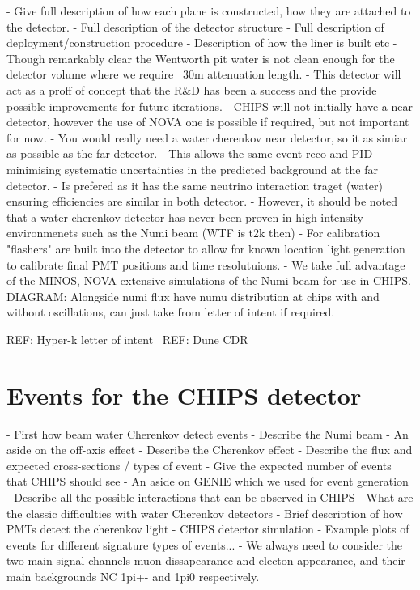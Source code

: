 - Give full description of how each plane is constructed, how they are attached to the detector.
- Full description of the detector structure
- Full description of deployment/construction procedure
- Description of how the liner is built etc
- Though remarkably clear the Wentworth pit water is not clean enough for the detector volume where we require ~30m attenuation length.
- This detector will act as a proff of concept that the R&D has been a success and the provide possible improvements for future iterations.
- CHIPS will not initially have a near detector, however the use of NOVA one is possible if required, but not important for now.
- You would really need a water cherenkov near detector, so it as simiar as possible as the far detector.
- This allows the same event reco and PID minimising systematic uncertainties in the predicted background at the far detector.
- Is prefered as it has the same neutrino interaction traget (water) ensuring efficiencies are similar in both detector.
- However, it should be noted that a water cherenkov detector has never been proven in high intensity environmenets such as the Numi beam (WTF is t2k then)
- For calibration "flashers" are built into the detector to allow for known location light generation to calibrate final PMT positions and time resolutuions.
- We take full advantage of the MINOS, NOVA extensive simulations of the Numi beam for use in CHIPS.
DIAGRAM: Alongside numi flux have numu distribution at chips with and without oscillations, can just take from letter of intent if required.





REF: Hyper-k letter of intent~\cite{abe2011}
REF: Dune CDR~\cite{acciarri2016}

\section{Events for the CHIPS detector}
\label{sec:chips_events}
- First how beam water Cherenkov detect events
- Describe the Numi beam
- An aside on the off-axis effect
- Describe the Cherenkov effect
- Describe the flux and expected cross-sections / types of event
- Give the expected number of events that CHIPS should see
- An aside on GENIE which we used for event generation
- Describe all the possible interactions that can be observed in CHIPS
- What are the classic difficulties with water Cherenkov detectors
- Brief description of how PMTs detect the cherenkov light
- CHIPS detector simulation
- Example plots of events for different signature types of events...
- We always need to consider the two main signal channels muon dissapearance and electon appearance, and their main backgrounds
NC 1pi+- and 1pi0 respectively.

